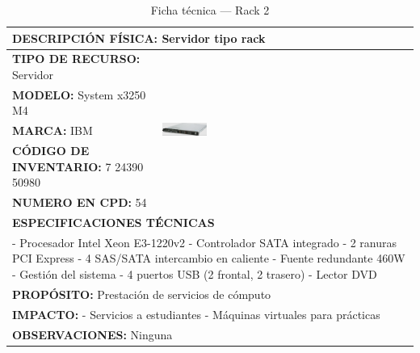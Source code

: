 \begin{table}[H]
\centering
\scriptsize
\setlength{\tabcolsep}{2pt}
\renewcommand{\arraystretch}{1.0}
\caption{Ficha técnica --- Rack 2}
\label{tab:rack-2}
\begin{tabular}{|p{}|p{}|}
\hline
\multicolumn{2}{|l|}{\textbf{DESCRIPCIÓN FÍSICA:} Servidor tipo rack} \\ \hline
\textbf{TIPO DE RECURSO:} Servidor & 
\multirow{5}{*}{\includegraphics[width=0.18\textwidth,keepaspectratio]{tablas-images/cp1/racks/rack-1.png}} \\ \cline{1-1}
\textbf{MODELO:} System x3250 M4 & \\ \cline{1-1}
\textbf{MARCA:} IBM & \\ \cline{1-1}
\textbf{CÓDIGO DE INVENTARIO:} 7 24390 50980 & \\ \cline{1-1}
\textbf{NUMERO EN CPD:} 54 & \\ \hline
\multicolumn{2}{|l|}{\textbf{ESPECIFICACIONES TÉCNICAS}} \\ \hline
\multicolumn{2}{|p{0.7\textwidth}|}{
- Procesador Intel Xeon E3-1220v2
- Controlador SATA integrado
- 2 ranuras PCI Express
- 4 SAS/SATA intercambio en caliente
- Fuente redundante 460W
- Gestión del sistema
- 4 puertos USB (2 frontal, 2 trasero)
- Lector DVD
} \\ \hline
\multicolumn{2}{|l|}{\textbf{PROPÓSITO:} Prestación de servicios de cómputo} \\ \hline
\multicolumn{2}{|p{0.7\textwidth}|}{\textbf{IMPACTO:} 
- Servicios a estudiantes
- Máquinas virtuales para prácticas} \\ \hline
\multicolumn{2}{|p{0.7\textwidth}|}{\textbf{OBSERVACIONES:} Ninguna} \\ \hline
\end{tabular}
\end{table}

